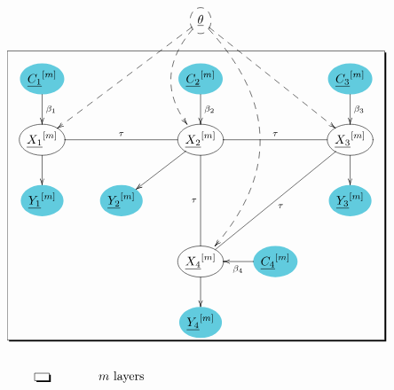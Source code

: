 \documentclass[12pt]{article}
\begin{document}
\begin{figure}[h!]\centering
$$\xymatrix{
&&*++[o][F--]{\underline{\theta}}\ar@[black]@{-->}[ddll]\ar@[black]@{-->}@/_2pc/[dd]\ar@[black]@{-->}[ddrr]\ar@[black]@{-->}@/^4pc/[dddd]&&
\\
*++[o][F*:SkyBlue]{\underline{C_1}^{[m]}}\ar@[black][d]^{\color{black} \beta_1}&&*++[o][F*:SkyBlue]{\underline{C_2}^{[m]}}\ar@[black][d]^{\color{black} \beta_2}&&*++[o][F*:SkyBlue]{\underline{C_3}^{[m]}}\ar@[black][d]^{\color{black} \beta_3}
\\
*++[o][F]{\underline{X_1}^{[m]}}\ar@[black]@{-}[rr]^{\color{black} \tau}\ar[d]&&*++[o][F]{\underline{X_2}^{[m]}}\ar@[black]@{-}[rr]^{\color{black} \tau}\ar@[black]@{-}[dd]_{\color{black} \tau}\ar[dl]&&*++[o][F]{\underline{X_3}^{[m]}}\ar@[black]@{-}[ddll]^{\color{black} \tau}\ar[d]
\\
*++[o][F*:SkyBlue]{\underline{Y_1}^{[m]}}&*++[o][F*:SkyBlue]{\underline{Y_2}^{[m]}}&&&*++[o][F*:SkyBlue]{\underline{Y_3}^{[m]}}
\\
&&*++[o][F]{\underline{X_4}^{[m]}}\ar[d]&*++[o][F*:SkyBlue]{\underline{C_4}^{[m]}}\ar@[black][l]^{\color{black} \beta_4}&
\\
&&*++[o][F*:SkyBlue]{\underline{Y_4}^{[m]}}&&
\save
\POS"2,1"."6,1"."2,5"."6,5"!C*+<2.0em>\frm{-,}
\restore
\\
*+[F-,]{\;\;}&\text{$m$ layers}
}$$
\caption{}
\label{fig-texnn-for-gmrf}
\end{figure}
\end{document}
